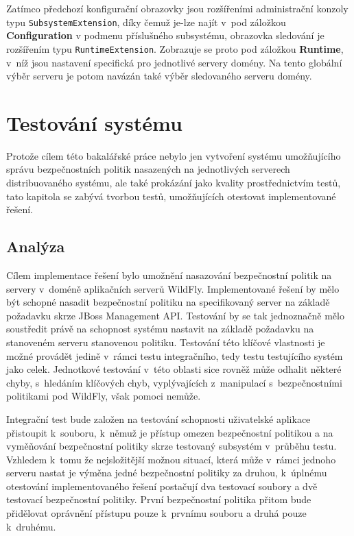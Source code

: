 Zatímco předchozí konfigurační obrazovky jsou rozšířeními administrační konzoly typu {\tt SubsystemExtension}, díky čemuž je-lze najít v~pod záložkou {\bf Configuration} v podmenu příslušného subsystému, obrazovka sledování je rozšířením typu {\tt RuntimeExtension}. Zobrazuje se proto pod záložkou {\bf Runtime}, v~níž jsou nastavení specifická pro jednotlivé servery domény. Na tento globální výběr serveru je potom navázán také výběr sledovaného serveru domény.

\chapter{Testování systému} \label{testovani}

Protože cílem této bakalářské práce nebylo jen vytvoření systému umožňujícího správu bezpečnostních politik nasazených na jednotlivých serverech distribuovaného systému, ale také prokázání jako kvality prostřednictvím testů, tato kapitola se zabývá tvorbou testů, umožňujících otestovat implementované řešení.

\section{Analýza} %

Cílem implementace řešení bylo umožnění nasazování bezpečnostní politik na servery v~doméně aplikačních serverů WildFly.
Implementované řešení by mělo být schopné nasadit bezpečnostní politiku na specifikovaný server na základě požadavku skrze JBoss Management API.
Testování by se tak jednoznačně mělo soustředit právě na schopnost systému nastavit na základě požadavku na stanoveném serveru stanovenou politiku.
Testování této klíčové vlastnosti je možné provádět jedině v~rámci testu integračního, tedy testu testujícího systém jako celek.
Jednotkové testování v~této oblasti sice rovněž může odhalit některé chyby, s~hledáním klíčových chyb, vyplývajících z~manipulací s~bezpečnostními politikami pod WildFly, však pomoci nemůže.

Integrační test bude založen na testování schopnosti uživatelské aplikace přistoupit k~souboru, k~němuž je přístup omezen bezpečnostní politikou a na vyměňování bezpečnostní politiky skrze testovaný subsystém v~průběhu testu.
Vzhledem k~tomu že nejsložitější možnou situací, která může v~rámci jednoho serveru nastat je výměna jedné bezpečnostní politiky za druhou, k~úplnému otestování implementovaného řešení postačují dva testovací soubory a dvě testovací bezpečnostní politiky.
První bezpečnostní politika přitom bude přidělovat oprávnění přístupu pouze k~prvnímu souboru a druhá pouze k~druhému.

